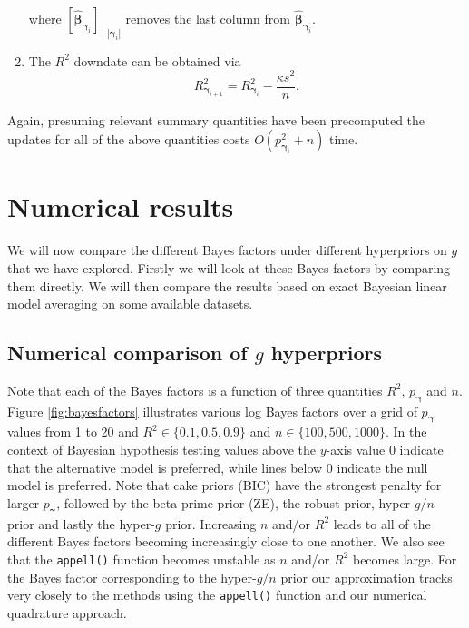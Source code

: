 \documentclass[12pt]{article}
\def\vectorfontone{\bf}
\def\vectorfonttwo{\boldsymbol}
\def\vy{{\vectorfontone y}}                      %
\def\vbeta{{\vectorfonttwo \beta}}               %
\def\vgamma{{\vectorfonttwo \gamma}}             %
\def\matrixfontone{\bf}
\def\mC{{\matrixfontone C}}                      %
\def\mX{{\matrixfontone X}}                      %
\begin{document}
\begin{enumerate}
	\noindent where $[ \widehat{\vbeta}_{\vgamma_{i}}]_{-|{\vgamma_{i}}|}$
	removes the last column from $\widehat{\vbeta}_{\vgamma_{i}}$.
	
	\item 
	The $R^2$ downdate can be obtained
	via
	$$
	R_{\vgamma_{i+1}}^2 = R_{\vgamma_{i}}^2 - \frac{\kappa s^2}{n}.
	$$
	
	
\end{enumerate}

\noindent Again, presuming relevant summary quantities have been precomputed
the updates for all of the above quantities costs $O(p_{\vgamma_{i}}^2 + n)$ time.



 
 
\section{Numerical results}
\label{sec:numerical}

We will now compare the different Bayes factors under different hyperpriors on $g$ that we have explored. 
Firstly we will look at these Bayes factors by comparing them directly.
We will then compare the results based on exact Bayesian linear model
averaging on some available datasets.


\subsection{Numerical comparison of $g$ hyperpriors}

Note that
each of the Bayes factors is a function of three quantities $R^2$, $p_\vgamma$ 
and $n$. Figure \ref{fig:bayesfactors} illustrates various log Bayes factors
over a grid of $p_\vgamma$ values from 1 to 20 and $R^2\in\{0.1,0.5,0.9\}$
and $n \in \{100,500,1000\}$. In the context of Bayesian hypothesis testing
values above the $y$-axis value 0 indicate that the alternative model is
preferred, while lines below 0 indicate the null model is preferred. Note that
cake priors (BIC) have the strongest penalty for larger $p_\vgamma$, followed
by the beta-prime prior (ZE), the robust prior, hyper-$g/n$ prior and lastly
the hyper-$g$ prior. Increasing $n$ and/or $R^2$ leads to all of the different
Bayes factors becoming increasingly close to one another. We also see that 
the {\tt appell()} function becomes unstable as $n$ and/or $R^2$ becomes large.
For the Bayes factor corresponding to the hyper-$g/n$ prior our approximation
tracks very closely to the methods using the {\tt appell()} function and our
numerical quadrature approach.
\end{document}
